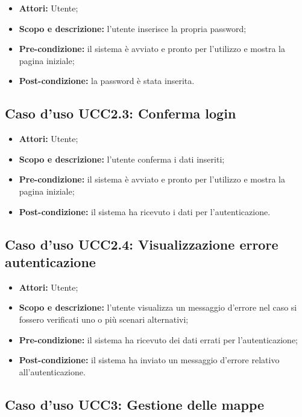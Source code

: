 \begin{itemize}
\item \textbf{Attori:} Utente;
\item \textbf{Scopo e descrizione:} l'utente inserisce la propria password;
\item \textbf{Pre-condizione:} il sistema è avviato e pronto per l'utilizzo e mostra la pagina iniziale;
\item \textbf{Post-condizione:} la password è stata inserita.
\end{itemize}

\subsection{Caso d'uso UCC2.3: Conferma login}

\begin{itemize}
\item \textbf{Attori:} Utente;
\item \textbf{Scopo e descrizione:} l'utente conferma i dati inseriti;
\item \textbf{Pre-condizione:} il sistema è avviato e pronto per l'utilizzo e mostra la pagina iniziale;
\item \textbf{Post-condizione:} il sistema ha ricevuto i dati per l'autenticazione. 
\end{itemize}

\subsection{Caso d'uso UCC2.4: Visualizzazione errore autenticazione}

\begin{itemize}
\item \textbf{Attori:} Utente;
\item \textbf{Scopo e descrizione:} l'utente visualizza un messaggio d'errore nel caso si fossero verificati uno o più scenari alternativi;
\item \textbf{Pre-condizione:} il sistema ha ricevuto dei dati errati per l'autenticazione;
\item \textbf{Post-condizione:} il sistema ha inviato un messaggio d'errore relativo all'autenticazione. 
\end{itemize}


\subsection{Caso d'uso UCC3: Gestione delle mappe}

